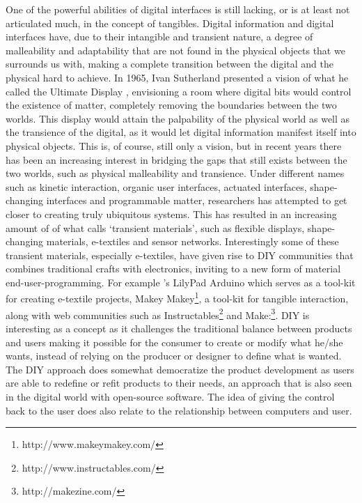 One of the powerful abilities of digital interfaces is still lacking, or is at least not articulated much, in the concept of tangibles. 
Digital information and digital interfaces have, due to their intangible and transient nature, a degree of malleability and adaptability that are not found in the physical objects that we surrounds us with, making a complete transition between the digital and the physical hard to achieve. 
\blank
In 1965, Ivan Sutherland presented a vision of what he called the Ultimate Display \citep{sutherland1965ultimate}, envisioning a room where digital bits would control the existence of matter, completely removing the boundaries between the two worlds.
This display would attain the palpability of the physical world as well as the transience of the digital, as it would let digital information manifest itself into physical objects.
This is, of course, still only a vision, but in recent years there has been an increasing interest in bridging the gaps that still exists between the two worlds, such as physical malleability and transience.
Under different names such as kinetic interaction, organic user interfaces, actuated interfaces, shape-changing interfaces and programmable matter, researchers has attempted to get closer to creating truly ubiquitous systems.    
This has resulted in an increasing amount of of what \citet{coelho2009programming} calls `transient materials', such as flexible displays, shape-changing materials, e-textiles and sensor networks.
\blank
Interestingly some of these transient materials, especially e-textiles, have given rise to DIY communities that combines traditional crafts with electronics, inviting to a new form of material end-user-programming.
For example \citet{buechley2008lilypad}'s LilyPad Arduino which serves as a tool-kit for creating e-textile projects, Makey Makey\footnote{http://www.makeymakey.com/}, a tool-kit for tangible interaction, along with web communities such as Instructables\footnote{http://www.instructables.com/} and Make:\footnote{http://makezine.com/}.
DIY is interesting as a concept as it challenges the traditional balance between products and users making it possible for the consumer to create  or modify what he/she wants, instead of relying on the producer or designer to define what is wanted.
The DIY approach does somewhat democratize the product development as users are able to redefine or refit products to their needs, an approach that is also seen in the digital world with open-source software.
\blank
The idea of giving the control back to the user does also relate to the relationship between computers and user.
